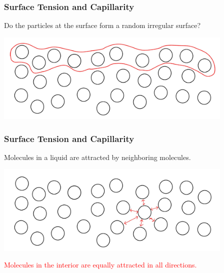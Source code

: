\documentclass[]{beamer}
\begin{document}


\begin{frame}

\frametitle{Surface Tension and Capillarity}

Do the particles at the surface form a random irregular surface?

  \begin{center}
  \includegraphics[height=1.7in]{images2/surfacet4.jpg}
\end{center}





 \end{frame}



\begin{frame}

\frametitle{Surface Tension and Capillarity}

Molecules in a liquid are attracted by
neighboring molecules.



  \begin{center}
  \includegraphics[height=1.7in]{images2/surfacet2.jpg}
\end{center}


\textcolor{red}{Molecules in the
interior are equally
attracted in all
directions.}


 \end{frame}

\end{document}

